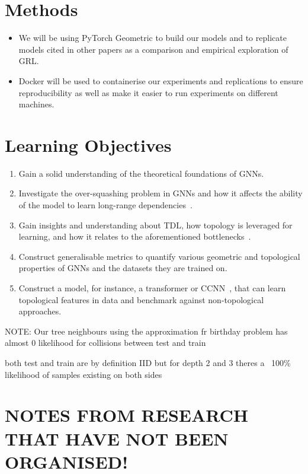 \documentclass[a4paper,12pt]{article}
\begin{document}
\section{Methods}
\begin{itemize}
	\item  We will be using PyTorch Geometric to build our models and to replicate models cited in other papers as a comparison and empirical exploration of GRL.
	\item Docker will be used to containerise our experiments and replications to ensure reproducibility as well as make it easier to run experiments on different machines.
\end{itemize}

\section{Learning Objectives}


\begin{enumerate}
	\item Gain a solid understanding of the theoretical foundations of GNNs.
	\item Investigate the over-squashing problem in GNNs and how it affects the ability of the model to learn long-range dependencies~\cite{alon_bottleneck_2021}.
	\item Gain insights and understanding about TDL, how topology is leveraged for learning, and how it relates to the aforementioned bottlenecks~\cite{horn_topological_2022}.
	\item Construct generalisable metrics to quantify various geometric and topological properties of GNNs and the datasets they are trained on.
	\item Construct a model, for instance, a transformer or CCNN~\cite{tdlbook}, that can learn topological features in data and benchmark against non-topological approaches.
\end{enumerate}

NOTE:
Our tree neighbours using the approximation fr birthday problem has almost 0 likelihood for collisions between test and train

both test and train are by definition IID but for depth 2 and 3 theres a ~100\% likelihood of samples existing on both sides


\section{NOTES FROM RESEARCH THAT HAVE NOT BEEN ORGANISED!}
\end{document}
